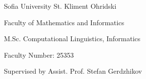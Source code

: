 \makeatletter
\begin{titlepage}
  \begin{center}
    {\LARGE Sofia University St. Kliment Ohridski\par}
    {\Large Faculty of Mathematics and Informatics\par}

    \vfill

    {\Huge \@title\par}

    \vfill

    {\huge \@author\par}

    \vspace{0.3cm}

    {\large M.Sc. Computational Linguistics, Informatics\par}

    \vspace{0.3cm}

    {\large Faculty Number: 25353\par}

    \vspace{1.5cm}

    {\Large Supervised by Assist. Prof. Stefan Gerdzhikov\par}

    \vspace{3cm}

    {\large \@date}
  \end{center}
\end{titlepage}
\makeatother
